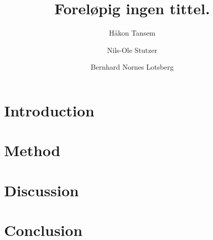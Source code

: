 \documentclass[twocolumn]{aastex62}
\begin{document}
\title{\Large Foreløpig ingen tittel.}

\author{Håkon Tansem}

\author{Nils-Ole Stutzer}

\author{Bernhard Nornes Lotsberg}

\begin{abstract}

\end{abstract}

\section{Introduction} \label{sec:intro}
 
\section{Method} \label{sec:method}

\section{Discussion} \label{sec:discussion}

\section{Conclusion} \label{sec:conclusion}

\nocite{Jensen:2019}



\end{document}
